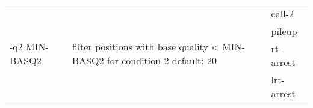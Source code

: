 {\small
\begin{tabular}{@{}p{}p{}l@{}}
\multirow{4}{=}{-q2 MIN-BASQ2} & \multirow{4}{=}{filter positions with base quality < MIN-BASQ2 for condition 2
 default: 20} & call-2 \\
 &  & pileup \\
 &  & rt-arrest \\
 &  & lrt-arrest \\
\end{tabular}\\
}
